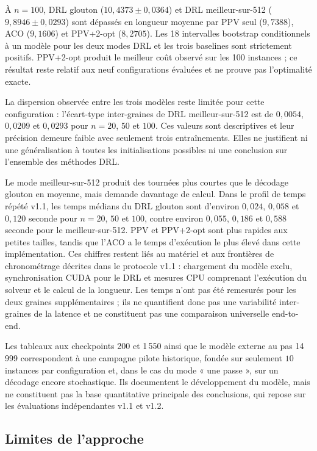 \documentclass[12pt, a4paper, twoside, openright]{book}
\begin{document}
À $n=100$, DRL glouton ($10{,}4373\pm0{,}0364$) et DRL meilleur-sur-512
($9{,}8946\pm0{,}0293$) sont dépassés en longueur moyenne par PPV seul
($9{,}7388$), ACO ($9{,}1606$) et PPV+2-opt ($8{,}2705$). Les 18 intervalles
bootstrap conditionnels à un modèle pour les deux modes DRL et les trois
baselines sont strictement positifs. PPV+2-opt produit le meilleur coût
observé sur les 100 instances ; ce résultat reste relatif aux neuf
configurations évaluées et ne prouve pas l'optimalité exacte.

La dispersion observée entre les trois modèles reste limitée pour cette
configuration : l'écart-type inter-graines de DRL meilleur-sur-512 est de
$0{,}0054$, $0{,}0209$ et $0{,}0293$ pour $n=20$, $50$ et $100$. Ces valeurs
sont descriptives et leur précision demeure faible avec seulement trois
entraînements. Elles ne justifient ni une généralisation à toutes les
initialisations possibles ni une conclusion sur l'ensemble des méthodes DRL.

Le mode meilleur-sur-512 produit des tournées plus courtes que le décodage
glouton en moyenne, mais demande davantage de calcul. Dans le profil de temps
répété v1.1, les temps médians du DRL glouton sont d'environ $0{,}024$,
$0{,}058$ et $0{,}120$ seconde pour $n=20$, $50$ et $100$, contre environ
$0{,}055$, $0{,}186$ et $0{,}588$ seconde pour le meilleur-sur-512. PPV et
PPV+2-opt sont plus rapides aux petites tailles, tandis que l'ACO a le temps
d'exécution le plus élevé dans cette implémentation. Ces chiffres restent
liés au matériel et aux frontières de chronométrage décrites dans le protocole
v1.1 : chargement du modèle exclu, synchronisation CUDA pour le DRL et mesures
CPU comprenant l'exécution du solveur et le calcul de la longueur. Les temps
n'ont pas été remesurés pour les deux graines supplémentaires ; ils ne
quantifient donc pas une variabilité inter-graines de la latence et ne
constituent pas une comparaison universelle end-to-end.

Les tableaux aux checkpoints 200 et 1\,550 ainsi que le modèle externe au pas
14\,999 correspondent à une campagne pilote historique, fondée sur seulement
$10$ instances par configuration et, dans le cas du mode « une passe », sur un
décodage encore stochastique. Ils documentent le développement du modèle,
mais ne constituent pas la base quantitative principale des conclusions,
qui repose sur les évaluations indépendantes v1.1 et v1.2.

\subsection{Limites de l'approche}
\label{sec:ch4-limites}
\end{document}
